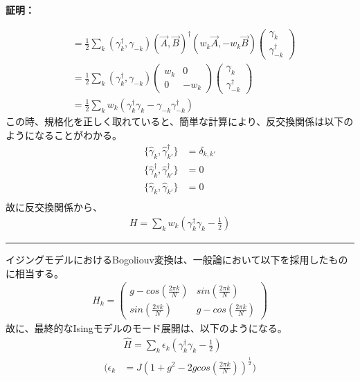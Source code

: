 \documentclass[a4paper,10.5pt]{article}
\numberwithin{equation}{section}
\newenvironment{proofbox}
{\begin{prooflabel}\textbf{証明：}\end{prooflabel}\vspace{0.8em}}
{\par\vspace{1em}\hrule\vspace{1em}}
\begin{document}
\begin{proofbox}
\begin{align*}
        &=\frac{1}{2}\sum_{k}(\gamma^{\dagger}_{k},\gamma_{-k})(\vec{A},\vec{B})^{\dagger}(w_{k}\vec{A},-w_{k}\vec{B})\begin{pmatrix}
            \gamma_{k} \\ \gamma_{-k}^{\dagger}
        \end{pmatrix}\\
        &=\frac{1}{2}\sum_{k}(\gamma^{\dagger}_{k},\gamma_{-k})\begin{pmatrix}
            w_{k} & 0\\
            0 & -w_{k}
        \end{pmatrix}\begin{pmatrix}
            \gamma_{k} \\ \gamma_{-k}^{\dagger}
        \end{pmatrix}\\
        &=\frac{1}{2}\sum_{k}w_{k}(\gamma^{\dagger}_{k}\gamma_{k}-\gamma_{-k}\gamma_{-k}^{\dagger})
    \end{align*}
    この時、規格化を正しく取れていると、簡単な計算により、反交換関係は以下のようになることがわかる。
\begin{equation}\begin{split}
    \{\hat{\gamma}_{k},\hat{\gamma}_{k'}^{\dagger}\} &= \delta_{k,k'}\\
    \{\hat{\gamma}_{k}^{\dagger},\hat{\gamma}_{k'}^{\dagger}\} &= 0\\
    \{\hat{\gamma}_{k},\hat{\gamma}_{k'}\} &= 0\\
\end{split} \end{equation}
故に反交換関係から、
\begin{align*}
        H=\sum_{k}w_{k}(\gamma_{k}^{\dagger}\gamma_{k}-\frac{1}{2})
    \end{align*}
\end{proofbox}
イジングモデルにおけるBogoliouv変換は、一般論において以下を採用したものに相当する。
\begin{align*}
   H_{k}= \begin{pmatrix}
           g-cos(\frac{2\pi k}{N}) & sin(\frac{2\pi k}{N})\\
           sin(\frac{2\pi k}{N}) & g-cos(\frac{2\pi k}{N})
       \end{pmatrix}
\end{align*}
故に、最終的なIsingモデルのモード展開は、以下のようになる。
\begin{equation}\begin{split}
    &\hat{H} = \sum_{k} \epsilon_{k}(\gamma^{\dagger}_{k} \gamma_{k}-\frac{1}{2})\\
    (\epsilon_{k}&=J(1+g^{2}-2gcos(\frac{2\pi k}{N}))^{\frac{1}{2}})
\end{split} \end{equation}
\end{document}
